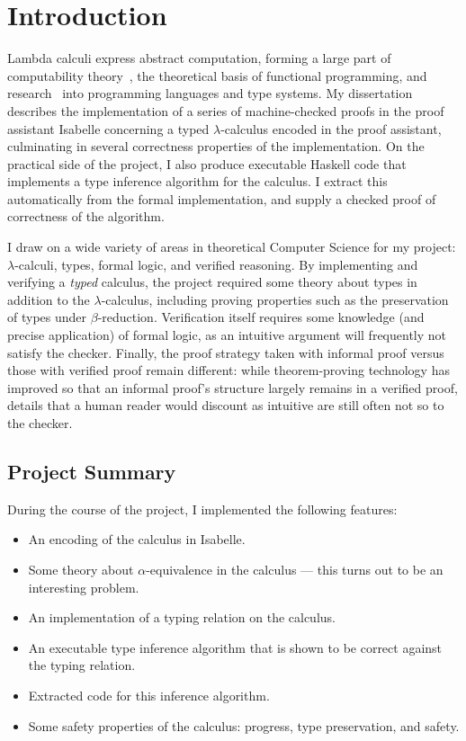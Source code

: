 \chapter{Introduction}
Lambda calculi express abstract computation, forming a large part of computability theory~\cite{lambda-computability}, the theoretical basis of functional programming, and research~\cite{lambda-programming} into programming languages and type systems.
My dissertation describes the implementation of a series of machine-checked proofs in the proof assistant Isabelle concerning a typed \(\lambda\)-calculus encoded in the proof assistant, culminating in several correctness properties of the implementation.
On the practical side of the project, I also produce executable Haskell code that implements a type inference algorithm for the calculus.
I extract this automatically from the formal implementation, and supply a checked proof of correctness of the algorithm.

I draw on a wide variety of areas in theoretical Computer Science for my project: \(\lambda\)-calculi, types, formal logic, and verified reasoning.
By implementing and verifying a \emph{typed} calculus, the project required some theory about types in addition to the \(\lambda\)-calculus, including proving properties such as the preservation of types under \(\beta\)-reduction.
Verification itself requires some knowledge (and precise application) of formal logic, as an intuitive argument will frequently not satisfy the checker.
Finally, the proof strategy taken with informal proof versus those with verified proof remain different: while theorem-proving technology has improved so that an informal proof's structure largely remains in a verified proof, details that a human reader would discount as intuitive are still often not so to the checker.

\section{Project Summary}
During the course of the project, I implemented the following features:
\begin{itemize}
\item
An encoding of the calculus in Isabelle.
\item
Some theory about \(\alpha\)-equivalence in the calculus --- this turns out to be an interesting problem.
\item
An implementation of a typing relation on the calculus.
\item
An executable type inference algorithm that is shown to be correct against the typing relation.
\item
Extracted code for this inference algorithm.
\item
Some safety properties of the calculus: progress, type preservation, and safety.
\end{itemize}

